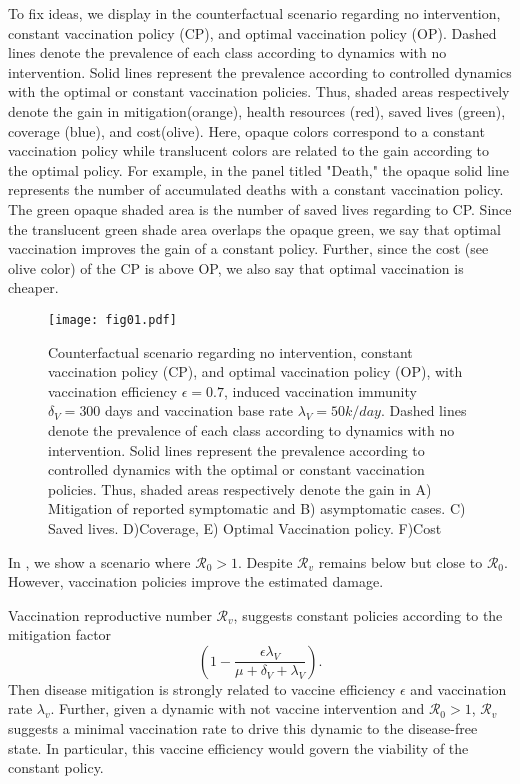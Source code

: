     To fix ideas,  we display in  the counterfactual
scenario regarding no intervention, constant vaccination policy (CP), and
optimal vaccination policy (OP). Dashed lines denote the prevalence of each
class according to dynamics with no intervention. Solid lines represent the
prevalence according to controlled dynamics with the optimal or constant
vaccination policies. Thus, shaded areas respectively denote the gain in
mitigation(orange), health resources (red), saved lives (green), coverage
(blue), and cost(olive). Here, opaque colors correspond to a constant
vaccination policy while translucent colors are related to the gain
according to the optimal policy. For example, in the panel titled "Death,"
the opaque solid line represents the number of accumulated deaths with a
constant vaccination policy. The green opaque shaded area is the number of
saved lives regarding to CP. Since the translucent green shade area overlaps
the opaque green, we say that optimal vaccination improves the gain of a
constant policy. Further, since the cost (see olive color) of the CP is above
OP, we also say that optimal vaccination is cheaper.
\begin{figure}[h!]
  \texttt{[image: fig01.pdf]}
  \caption{
        Counterfactual scenario regarding no intervention, constant
        vaccination policy (CP), and optimal vaccination policy (OP),
        with vaccination efficiency $\epsilon = 0.7$, induced vaccination
        immunity $\delta_V= 300$ days and vaccination base rate
        $\lambda_V = 50 k/day$.
        Dashed lines denote the prevalence of each class according to
        dynamics with no intervention. Solid lines represent
        the prevalence according to controlled dynamics with the
        optimal or constant vaccination policies. Thus, shaded areas
        respectively denote the gain in
        A) Mitigation of reported symptomatic and B) asymptomatic cases.
        C) Saved lives. D)Coverage, E) Optimal Vaccination policy.
        F)Cost
}
        \label{fig:bocop_scene}
\end{figure}


In , we show a scenario where $\mathcal{R}_0>1$. Despite $\mathcal{R}_v$ remains below but close to $\mathcal{R}_0$.
However, vaccination policies improve the estimated damage.

Vaccination reproductive number $\mathcal{R}_v$, suggests constant policies
according to the mitigation factor
$$
    \left(
        1 -
        \frac{\epsilon \lambda_V}{\mu+\delta_V+\lambda_V}
    \right).
$$
Then disease mitigation is strongly related to vaccine efficiency
$\epsilon$ and vaccination rate $\lambda_v$. Further, given a dynamic with
not vaccine intervention and $\mathcal{R}_0>1$, $\mathcal{R}_v$ suggests a minimal vaccination rate to drive this dynamic to the disease-free state.
In particular, this vaccine efficiency would govern the viability of the
constant policy.



